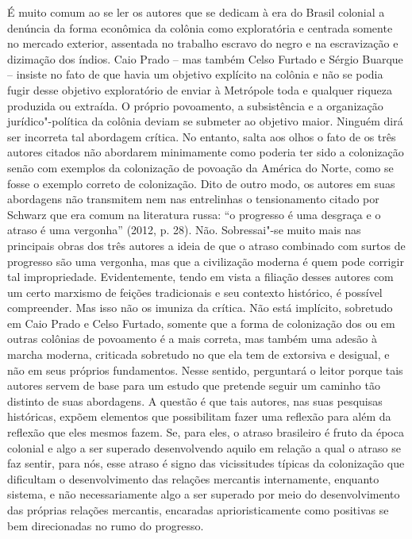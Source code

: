 É muito comum ao se ler os autores que se dedicam à era do Brasil
colonial a denúncia da forma econômica da colônia como exploratória e
centrada somente no mercado exterior, assentada no trabalho escravo do
negro e na escravização e dizimação dos índios. Caio Prado -- mas também
Celso Furtado e Sérgio Buarque -- insiste no fato de que havia um
objetivo explícito na colônia e não se podia fugir desse objetivo
exploratório de enviar à Metrópole toda e qualquer riqueza produzida ou
extraída. O próprio povoamento, a subsistência e a organização
jurídico"-política da colônia deviam se submeter ao objetivo maior.
Ninguém dirá ser incorreta tal abordagem crítica. No entanto, salta aos
olhos o fato de os três autores citados não abordarem minimamente como
poderia ter sido a colonização senão com exemplos da colonização de
povoação da América do Norte, como se fosse o exemplo correto de
colonização. Dito de outro modo, os autores em suas abordagens não
transmitem nem nas entrelinhas o tensionamento citado por Schwarz que
era comum na literatura russa: ``o progresso é uma desgraça e o atraso é
uma vergonha'' (2012, p. 28). Não. Sobressai"-se muito mais nas
principais obras dos três autores a ideia de que o atraso combinado com
surtos de progresso são uma vergonha, mas que a civilização moderna é
quem pode corrigir tal impropriedade. Evidentemente, tendo em vista a
filiação desses autores com um certo marxismo de feições tradicionais e
seu contexto histórico, é possível compreender. Mas isso não os imuniza
da crítica. Não está implícito, sobretudo em Caio Prado e Celso Furtado,
somente que a forma de colonização dos  ou em outras colônias de
povoamento é a mais correta, mas também uma adesão à marcha moderna,
criticada sobretudo no que ela tem de extorsiva e desigual, e não em
seus próprios fundamentos. Nesse sentido, perguntará o leitor porque
tais autores servem de base para um estudo que pretende seguir um
caminho tão distinto de suas abordagens. A questão é que tais autores,
nas suas pesquisas históricas, expõem elementos que possibilitam fazer
uma reflexão para além da reflexão que eles mesmos fazem. Se, para eles,
o atraso brasileiro é fruto da época colonial e algo a ser superado
desenvolvendo aquilo em relação a qual o atraso se faz sentir, para nós,
esse atraso é signo das vicissitudes típicas da colonização que
dificultam o desenvolvimento das relações mercantis internamente,
enquanto sistema, e não necessariamente algo a ser superado por meio do
desenvolvimento das próprias relações mercantis, encaradas
aprioristicamente como positivas se bem direcionadas no rumo do
progresso.

